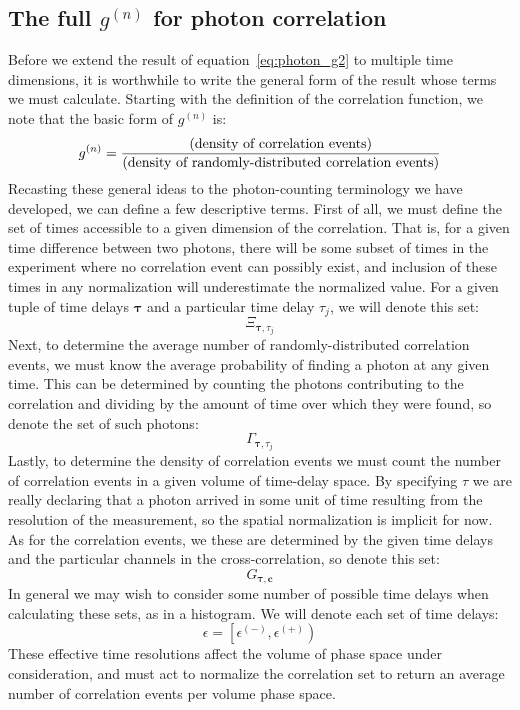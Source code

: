\documentclass{article}
\newcommand{\parens}[1]{\ensuremath{\left( #1 \right)}}
\newcommand{\gn}[1]{\ensuremath{g^{(#1)}}}
\renewcommand{\vec}{\boldsymbol}
\newcommand{\channel}{\ensuremath{c}}
\newcommand{\photons}{\ensuremath{\Gamma}}
\newcommand{\integrationtime}{\ensuremath{\Xi}}
\newcommand{\resolution}{\ensuremath{\epsilon}}
\newcommand{\correlationset}{\ensuremath{G}}
\newcommand{\upplus}{\ensuremath{^{(+)}}}
\newcommand{\upminus}{\ensuremath{^{(-)}}}
\begin{document}
\subsection{The full \gn{n} for photon correlation}
Before we extend the result of equation~\ref{eq:photon_g2} to multiple time dimensions, it is worthwhile to write the general form of the result whose terms we must calculate. Starting with the definition of the correlation function, we note that the basic form of \gn{n} is:
\begin{equation}
\gn{n} = \frac{\parens{\textnormal{density of correlation events}}}
              {\parens{\textnormal{density of randomly-distributed correlation events}}}
\end{equation}
Recasting these general ideas to the photon-counting terminology we have developed, we can define a few descriptive terms. First of all, we must define the set of times accessible to a given dimension of the correlation. That is, for a given time difference between two photons, there will be some subset of times in the experiment where no correlation event can possibly exist, and inclusion of these times in any normalization will underestimate the normalized value. For a given tuple of time delays $\vec{\tau}$ and a particular time delay $\tau_{j}$, we will denote this set:
\begin{equation}
\integrationtime_{\vec{\tau},\tau_{j}}
\end{equation}
Next, to determine the average number of randomly-distributed correlation events, we must know the average probability of finding a photon at any given time. This can be determined by counting the photons contributing to the correlation and dividing by the amount of time over which they were found, so denote the set of such photons:
\begin{equation}
\photons_{\vec{\tau},\tau_{j}}
\end{equation}
Lastly, to determine the density of correlation events we must count the number of correlation events in a given volume of time-delay space. By specifying $\tau$ we are really declaring that a photon arrived in some unit of time resulting from the resolution of the measurement, so the spatial normalization is implicit for now. As for the correlation events, we these are determined by the given time delays and the particular channels in the cross-correlation, so denote this set:
\begin{equation}
\correlationset_{\vec{\tau},\vec{\channel}}
\end{equation}
In general we may wish to consider some number of possible time delays when calculating these sets, as in a histogram. We will denote each set of time delays:
\begin{equation}
\resolution = \left[\resolution\upminus,\resolution\upplus\right)
\end{equation}
These effective time resolutions affect the volume of phase space under consideration, and must act to normalize the correlation set to return an average number of correlation events per volume phase space. 
\end{document}

